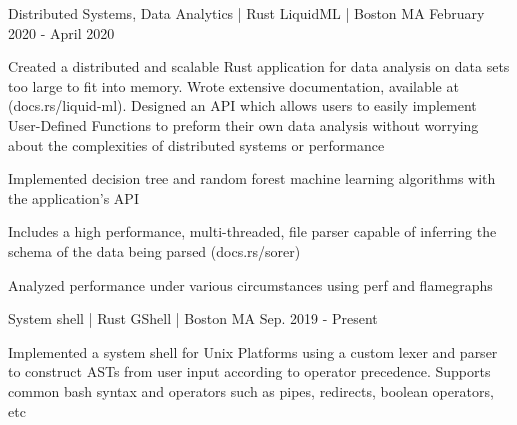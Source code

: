 

\begin{cventries}
    \cventry
    {Distributed Systems, Data Analytics | Rust} %
    {LiquidML | \href{https://github.com/goodSyntax808/liquid-ml}{\faGithub}} %
    {Boston MA} %
    {February 2020 - April 2020} %
    {
      \begin{cvitems} %
        \item {Created a distributed and scalable Rust application for data analysis on data sets too large to fit into memory. Wrote extensive documentation, available at (docs.rs/liquid-ml). Designed an API which allows users to easily implement User-Defined Functions to preform their own data analysis without worrying about the complexities of distributed systems or performance}
        \item {Implemented decision tree and random forest machine learning algorithms with the application's API}
        \item {Includes a high performance, multi-threaded, file parser capable of inferring the schema of the data being parsed (docs.rs/sorer)}
        \item {Analyzed performance under various circumstances using perf and flamegraphs}
      \end{cvitems}
    }

    \cventry
    {System shell | Rust} %
    {GShell | \href{https://github.com/goodSyntax808/gshell}{\faGithub}} %
    {Boston MA} %
    {Sep. 2019 - Present} %
    {
      \begin{cvitems} %
        \item {Implemented a system shell for Unix Platforms using a custom lexer and parser to construct ASTs from user input according to operator precedence. Supports common bash syntax and operators such as pipes, redirects, boolean operators, etc}
      \end{cvitems}
    }

\end{cventries}
